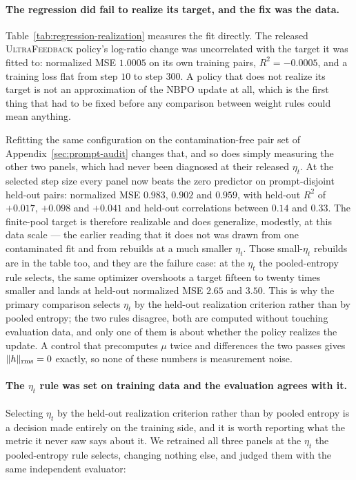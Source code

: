 \documentclass{article}
\theoremstyle{remark}
\theoremstyle{plain}
\newcommand{\NBPO}{\textsc{NBPO}}
\begin{document}
\paragraph{The regression did fail to realize its target, and the fix was the data.}
Table~\ref{tab:regression-realization} measures the fit directly. The released
\textsc{UltraFeedback} policy's log-ratio change was uncorrelated with the target it was fitted to:
normalized MSE $1.0005$ on its own training pairs, $R^2=-0.0005$, and a training loss flat from step
$10$ to step $300$. A policy that does not realize its target is not an approximation of the
\NBPO{} update at all, which is the first thing that had to be fixed before any comparison between
weight rules could mean anything.

Refitting the same configuration on the contamination-free pair set of
Appendix~\ref{sec:prompt-audit} changes that, and so does simply measuring the other two panels,
which had never been diagnosed at their released $\eta_t$. At the selected step size every panel now
beats the zero predictor on prompt-disjoint held-out pairs: normalized MSE $0.983$, $0.902$ and
$0.959$, with held-out $R^2$ of $+0.017$, $+0.098$ and $+0.041$ and held-out correlations between
$0.14$ and $0.33$. The finite-pool target is therefore realizable and does generalize, modestly, at
this data scale --- the earlier reading that it does not was drawn from one contaminated fit and
from rebuilds at a much smaller $\eta_t$. Those small-$\eta_t$ rebuilds are in the table too, and
they are the failure case: at the $\eta_t$ the pooled-entropy rule selects, the same optimizer
overshoots a target fifteen to twenty times smaller and lands at held-out normalized MSE $2.65$ and
$3.50$. This is why the primary comparison selects $\eta_t$ by the held-out realization criterion
rather than by pooled entropy; the two rules disagree, both are computed without touching evaluation
data, and only one of them is about whether the policy realizes the update. A control that
precomputes $\mu$ twice and differences the two passes gives $\|h\|_{\rm rms}=0$ exactly, so none
of these numbers is measurement noise.

\paragraph{The $\eta_t$ rule was set on training data and the evaluation agrees with it.}
Selecting $\eta_t$ by the held-out realization criterion rather than by pooled entropy is a decision
made entirely on the training side, and it is worth reporting what the metric it never saw says
about it. We retrained all three panels at the $\eta_t$ the
pooled-entropy rule selects, changing nothing else, and judged them with the same independent
evaluator:
\end{document}
